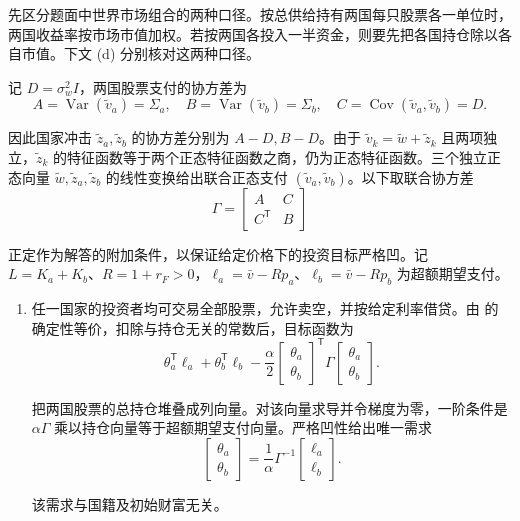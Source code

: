 \begin{solution}[blank-type=manual,blank-vsep=9\baselineskip]
先区分题面中世界市场组合的两种口径。按总供给持有两国每只股票各一单位时，两国收益率按市场市值加权。若按两国各投入一半资金，则要先把各国持仓除以各自市值。下文 (d) 分别核对这两种口径。

记 $D=\sigma_w^2I$，两国股票支付的协方差为
\[
 A=\operatorname{Var}(\widetilde v_a)=\Sigma_a,\quad
 B=\operatorname{Var}(\widetilde v_b)=\Sigma_b,\quad
 C=\operatorname{Cov}(\widetilde v_a,\widetilde v_b)=D.
\]

因此国家冲击 $\widetilde z_a,\widetilde z_b$ 的协方差分别为 $A-D,B-D$。由于 $\widetilde v_k=\widetilde w+\widetilde z_k$ 且两项独立，$\widetilde z_k$ 的特征函数等于两个正态特征函数之商，仍为正态特征函数。三个独立正态向量 $\widetilde w,\widetilde z_a,\widetilde z_b$ 的线性变换给出联合正态支付 $(\widetilde v_a,\widetilde v_b)$。以下取联合协方差
\[
 \Gamma=\begin{bmatrix}A&C\\C^{\mathsf T}&B\end{bmatrix}
\]

正定作为解答的附加条件，以保证给定价格下的投资目标严格凹。记 $L=K_a+K_b$、$R=1+r_F>0$，$\ell_a=\bar v-Rp_a$、$\ell_b=\bar v-Rp_b$ 为超额期望支付。
\begin{enumerate}[label=(\alph*)]
\item 任一国家的投资者均可交易全部股票，允许卖空，并按给定利率借贷。由 的确定性等价，扣除与持仓无关的常数后，目标函数为
\[
 \theta_a^{\mathsf T}\ell_a+\theta_b^{\mathsf T}\ell_b
 -\frac\alpha2
 \begin{bmatrix}\theta_a\\\theta_b\end{bmatrix}^{\mathsf T}
 \Gamma\begin{bmatrix}\theta_a\\\theta_b\end{bmatrix}.
\]

把两国股票的总持仓堆叠成列向量。对该向量求导并令梯度为零，一阶条件是 $\alpha\Gamma$ 乘以持仓向量等于超额期望支付向量。严格凹性给出唯一需求
\[
 \boxed{\begin{bmatrix}\theta_a\\\theta_b\end{bmatrix}
 =\frac1\alpha\Gamma^{-1}\begin{bmatrix}\ell_a\\\ell_b\end{bmatrix}}.
\]

该需求与国籍及初始财富无关。


\end{enumerate}
\end{solution}
